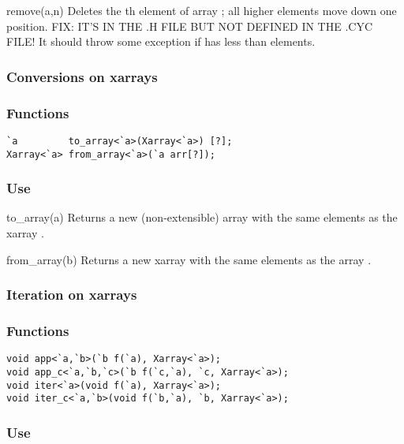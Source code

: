 \begin{defun}{remove}{(a,n)}
Deletes the th element of array ; all higher elements move
down one position.  FIX: IT'S IN THE .H FILE BUT NOT DEFINED IN THE .CYC
FILE!  It should throw some exception if  has less than 
elements.
\end{defun}

\subsubsection*{Conversions on xarrays}
\subsubsection*{Functions}
\begin{verbatim}
`a         to_array<`a>(Xarray<`a>) [?];
Xarray<`a> from_array<`a>(`a arr[?]);
\end{verbatim}

\subsubsection*{Use}

\begin{defun}{to_array}{(a)}
Returns a new (non-extensible) array with the same elements as the
xarray .
\end{defun}

\begin{defun}{from_array}{(b)}
Returns a new xarray with the same elements as the array .
\end{defun}

\subsubsection*{Iteration on xarrays}
\subsubsection*{Functions}
\begin{verbatim}
void app<`a,`b>(`b f(`a), Xarray<`a>);
void app_c<`a,`b,`c>(`b f(`c,`a), `c, Xarray<`a>);
void iter<`a>(void f(`a), Xarray<`a>);
void iter_c<`a,`b>(void f(`b,`a), `b, Xarray<`a>);
\end{verbatim}

\subsubsection*{Use}

